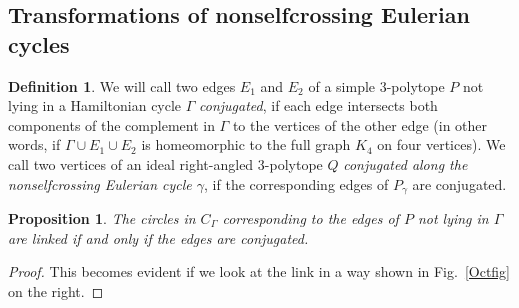 \documentclass[12pt]{amsart}
\newtheorem{proposition}[formula]{Proposition}
\theoremstyle{definition}
\newtheorem{definition}[formula]{Definition}
\theoremstyle{remark}
\begin{document}
\subsection{Transformations of nonselfcrossing Eulerian cycles}
\begin{definition}
We will call two edges $E_1$ and $E_2$ of a simple $3$-polytope $P$ not lying in a Hamiltonian cycle $\Gamma$ {\it conjugated}, 
if each edge intersects both components of the complement in $\Gamma$ to the vertices of the other edge 
(in other words, if $\Gamma\cup E_1\cup E_2$ is homeomorphic to the full graph $K_4$ on four vertices). We call two vertices
of an ideal right-angled $3$-polytope $Q$ {\it conjugated along the nonselfcrossing Eulerian cycle $\gamma$}, if 
the corresponding edges of $P_\gamma$ are conjugated.
\end{definition}

\begin{proposition}
The circles in $C_\Gamma$ corresponding to the edges 
of $P$ not lying in $\Gamma$ are linked if and only if the edges are conjugated.
\end{proposition}
\begin{proof}
This becomes evident if we look at the link in a way shown in Fig.~\ref{Octfig} on the right.
\end{proof}
\end{document}
